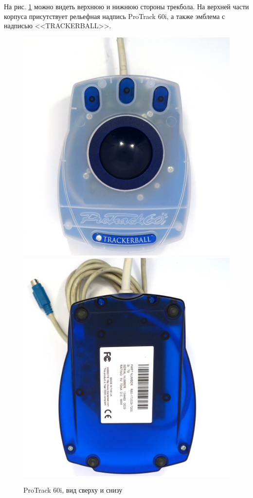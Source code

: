 \documentclass[11pt, a4paper]{article}
\begin{document}
На рис. \ref{fig:ProTrack60iTopBottom} можно видеть верхнюю и нижнюю стороны трекбола.
На верхней части корпуса присутствует рельефная надпись ProTrack 60i, а также эмблема с надписью <<TRACKERBALL>>.

\begin{figure}[h]
    \centering
    \includegraphics[scale=0.3]{1999_protrack_60i/monstr3_60.jpg}
    \includegraphics[scale=0.3]{1999_protrack_60i/monstr4_60.jpg}
    \caption{ProTrack 60i, вид сверху и снизу}
     \label{fig:ProTrack60iTopBottom}
\end{figure}
\end{document}
